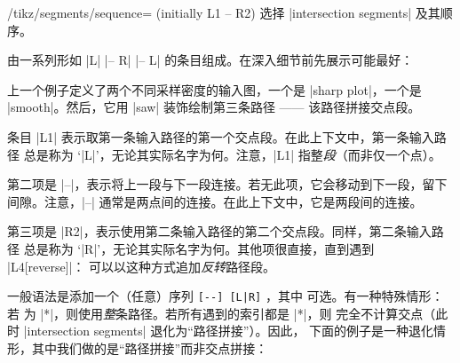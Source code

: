 {\begin{key}{/tikz/segments/sequence= (initially L1 -- R2)}
    选择 |intersection segments| 及其顺序。

     由一系列形如 |L| |-- R|
    |-- L| 的条目组成。在深入细节前先展示可能最好：
\begin{codeexample}[]
\end{codeexample}
    上一个例子定义了两个不同采样密度的输入图，一个是 |sharp plot|，一个是
    |smooth|。然后，它用 |saw| 装饰绘制第三条路径 —— 该路径拼接交点段。

    条目 |L1| 表示取第一条输入路径的第一个交点段。在此上下文中，第一条输入路径
    总是称为 `|L|'，无论其实际名字为何。注意，|L1| 指整\emph{段}（而非仅一个点）。

    第二项是 |--|，表示将上一段与下一段连接。若无此项，它会移动到下一段，留下
    间隙。注意，|--| 通常是两点间的连接。在此上下文中，它是两段间的连接。

    第三项是 |R2|，表示使用第二条输入路径的第二个交点段。同样，第二条输入路径
    总是称为 `|R|'，无论其实际名字为何。其他项很直接，直到遇到 |L4[reverse]|：
    可以以这种方式追加\emph{反转}路径段。

    一般语法是添加一个（任意）序列 \verb.[--] [L|R].
    ，其中  可选。有一种特殊情形：若
     为 |*|，则使用\emph{整}条路径。若所有遇到的索引都是 |*|，则
    完全不计算交点（此时 |intersection segments| 退化为“路径拼接”）。因此，
    下面的例子是一种退化情形，其中我们做的是“路径拼接”而非交点拼接：
\begin{codeexample}[]
\end{codeexample}
\end{key}}

